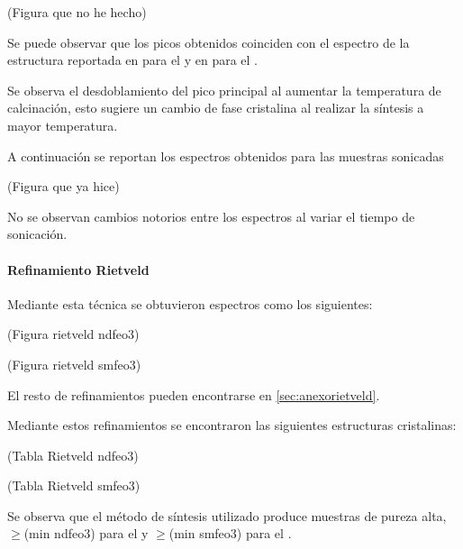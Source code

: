 \documentclass[../main.tex]{subfiles}
\begin{document}
(Figura que no he hecho)


Se puede observar que los picos obtenidos coinciden con el espectro de la estructura reportada en \cite{ndfeo3} para el \neod{} y en \cite{smfeo3} para el \sama{}.

Se observa el desdoblamiento del pico principal al aumentar la temperatura de calcinación, esto sugiere un cambio de fase cristalina al realizar la síntesis a mayor temperatura.

A continuación se reportan los espectros obtenidos para las muestras sonicadas

(Figura que ya hice)


No se observan cambios notorios entre los espectros al variar el tiempo de sonicación.

\paragraph{Refinamiento Rietveld}
Mediante esta técnica se obtuvieron espectros como los siguientes:

(Figura rietveld ndfeo3)


(Figura rietveld smfeo3)


El resto de refinamientos pueden encontrarse en \ref{sec:anexorietveld}.

Mediante estos refinamientos se encontraron 
las siguientes estructuras cristalinas:

(Tabla Rietveld ndfeo3)


(Tabla Rietveld smfeo3)


Se observa que el método de síntesis utilizado produce muestras de pureza alta, $\geq$(min ndfeo3) para el \neod{} y $\geq$(min smfeo3) para el \sama{}.
\end{document}
